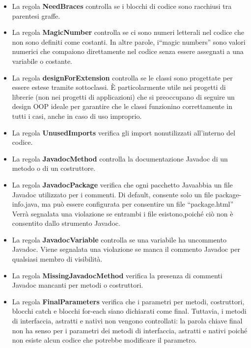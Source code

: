 	\begin{itemize}

		\item La regola \textbf{\textbf{NeedBraces}} controlla se i blocchi di codice  sono racchiusi tra parentesi graffe.

		\item La regola \textbf{\textbf{MagicNumber}} controlla se ci sono numeri letterali nel codice che non sono definiti come costanti. In altre parole, i“magic numbers” sono valori numerici che compaiono direttamente nel codice senza essere assegnati a una variabile o costante.

		\item La regola \textbf{\textbf{designForExtension}} controlla se le classi sono progettate per essere estese tramite sottoclassi. È particolarmente utile nei progetti di librerie (non nei progetti di applicazioni) che si preoccupano di seguire un design OOP ideale per garantire che le classi funzionino correttamente in tutti i casi, anche in caso di uso improprio.

		\item La regola \textbf{\textbf{UnusedImports}} verifica gli import nonutilizzati all’interno del codice.

		\item La regola \textbf{\textbf{JavadocMethod}} controlla la documentazione Javadoc di un metodo o di un costruttore.

		\item La regola \textbf{\textbf{JavadocPackage}} verifica che ogni pacchetto Javaabbia un file Javadoc utilizzato per i commenti. Di default, consente solo un file package-info.java, ma può essere configurata per consentire un file “package.html” Verrà segnalata una violazione se entrambi i file esistono,poiché ciò non è consentito dallo strumento Javadoc.

		\item La regola \textbf{\textbf{JavadocVariable}} controlla se una variabile ha uncommento Javadoc. Viene segnalata una violazione se manca il commento Javadoc per qualsiasi membro di visibilità.

		\item La regola \textbf{\textbf{MissingJavadocMethod}} verifica la presenza di commenti Javadoc mancanti per metodi o costruttori.

		\item La regola \textbf{\textbf{FinalParameters}} verifica che i parametri per metodi, costruttori, blocchi catch e blocchi for-each siano dichiarati come final. Tuttavia, i metodi di interfaccia, astratti e nativi non vengono controllati: la parola chiave final non ha senso per i parametri dei metodi di interfaccia, astratti e nativi poiché non esiste alcun codice che potrebbe modificare il parametro.


\end{itemize}
